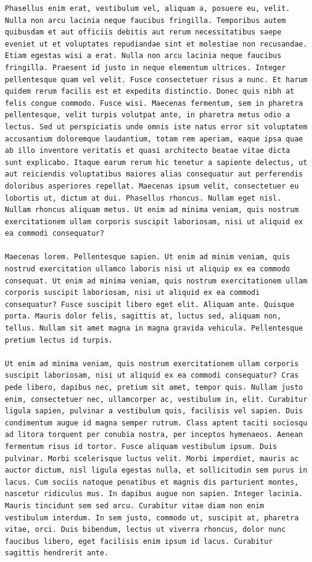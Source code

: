 \documentclass[a4paper, 12pt]{article}
\begin{document}
\begin{verbatim}
Phasellus enim erat, vestibulum vel, aliquam a, posuere eu, velit. Nulla non arcu lacinia neque faucibus fringilla. Temporibus autem quibusdam et aut officiis debitis aut rerum necessitatibus saepe eveniet ut et voluptates repudiandae sint et molestiae non recusandae. Etiam egestas wisi a erat. Nulla non arcu lacinia neque faucibus fringilla. Praesent id justo in neque elementum ultrices. Integer pellentesque quam vel velit. Fusce consectetuer risus a nunc. Et harum quidem rerum facilis est et expedita distinctio. Donec quis nibh at felis congue commodo. Fusce wisi. Maecenas fermentum, sem in pharetra pellentesque, velit turpis volutpat ante, in pharetra metus odio a lectus. Sed ut perspiciatis unde omnis iste natus error sit voluptatem accusantium doloremque laudantium, totam rem aperiam, eaque ipsa quae ab illo inventore veritatis et quasi architecto beatae vitae dicta sunt explicabo. Itaque earum rerum hic tenetur a sapiente delectus, ut aut reiciendis voluptatibus maiores alias consequatur aut perferendis doloribus asperiores repellat. Maecenas ipsum velit, consectetuer eu lobortis ut, dictum at dui. Phasellus rhoncus. Nullam eget nisl. Nullam rhoncus aliquam metus. Ut enim ad minima veniam, quis nostrum exercitationem ullam corporis suscipit laboriosam, nisi ut aliquid ex ea commodi consequatur?

Maecenas lorem. Pellentesque sapien. Ut enim ad minim veniam, quis nostrud exercitation ullamco laboris nisi ut aliquip ex ea commodo consequat. Ut enim ad minima veniam, quis nostrum exercitationem ullam corporis suscipit laboriosam, nisi ut aliquid ex ea commodi consequatur? Fusce suscipit libero eget elit. Aliquam ante. Quisque porta. Mauris dolor felis, sagittis at, luctus sed, aliquam non, tellus. Nullam sit amet magna in magna gravida vehicula. Pellentesque pretium lectus id turpis.

Ut enim ad minima veniam, quis nostrum exercitationem ullam corporis suscipit laboriosam, nisi ut aliquid ex ea commodi consequatur? Cras pede libero, dapibus nec, pretium sit amet, tempor quis. Nullam justo enim, consectetuer nec, ullamcorper ac, vestibulum in, elit. Curabitur ligula sapien, pulvinar a vestibulum quis, facilisis vel sapien. Duis condimentum augue id magna semper rutrum. Class aptent taciti sociosqu ad litora torquent per conubia nostra, per inceptos hymenaeos. Aenean fermentum risus id tortor. Fusce aliquam vestibulum ipsum. Duis pulvinar. Morbi scelerisque luctus velit. Morbi imperdiet, mauris ac auctor dictum, nisl ligula egestas nulla, et sollicitudin sem purus in lacus. Cum sociis natoque penatibus et magnis dis parturient montes, nascetur ridiculus mus. In dapibus augue non sapien. Integer lacinia. Mauris tincidunt sem sed arcu. Curabitur vitae diam non enim vestibulum interdum. In sem justo, commodo ut, suscipit at, pharetra vitae, orci. Duis bibendum, lectus ut viverra rhoncus, dolor nunc faucibus libero, eget facilisis enim ipsum id lacus. Curabitur sagittis hendrerit ante.


\end{verbatim}
\end{document}
